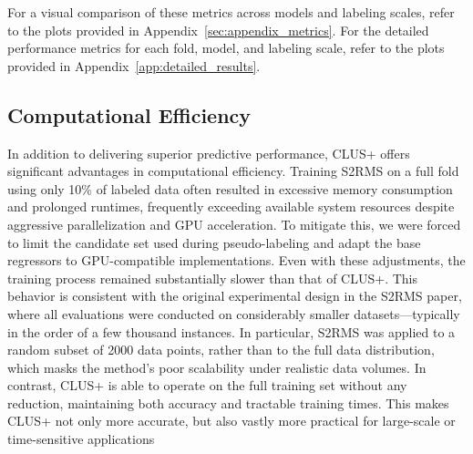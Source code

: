 For a visual comparison of these metrics across models and labeling scales, refer to the plots provided in Appendix~\ref{sec:appendix_metrics}.
For the detailed performance metrics for each fold, model, and labeling scale, refer to the plots provided in Appendix~\ref{app:detailed_results}.

\subsection{Computational Efficiency}

In addition to delivering superior predictive performance, CLUS+ offers significant advantages in computational efficiency. Training S2RMS on a full fold using only 10\% of labeled data often resulted in excessive memory consumption and prolonged runtimes, frequently exceeding available system resources despite aggressive parallelization and GPU acceleration. To mitigate this, we were forced to limit the candidate set used during pseudo-labeling and adapt the base regressors to GPU-compatible implementations. Even with these adjustments, the training process remained substantially slower than that of CLUS+. This behavior is consistent with the original experimental design in the S2RMS paper, where all evaluations were conducted on considerably smaller datasets—typically in the order of a few thousand instances. In particular, S2RMS was applied to a random subset of 2000 data points\cite{liu2024semi}, rather than to the full data distribution, which masks the method’s poor scalability under realistic data volumes. In contrast, CLUS+ is able to operate on the full training set without any reduction, maintaining both accuracy and tractable training times. This makes CLUS+ not only more accurate, but also vastly more practical for large-scale or time-sensitive applications